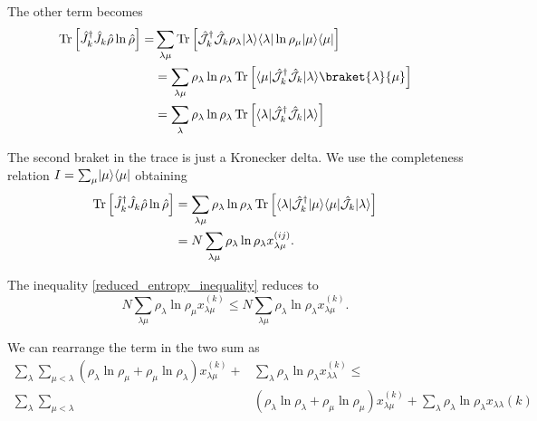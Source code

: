 The other term becomes
\begin{equation}
    \begin{split}
        \Tr\left[\hat J_{k}^\dagger \hat J_{k}\hat\rho\ln\hat\rho\right]=& \sum_{\lambda\mu}\Tr\left[\hat{\mathcal{J}}_{k}^\dagger \hat{\mathcal{J}}_{k}\rho_\lambda\ket{\lambda}\bra{\lambda}\ln\rho_\mu\ket{\mu}\bra{\mu}\right]\\
        & = \sum_{\lambda\mu}\rho_\lambda\ln\rho_\lambda\Tr\left[\bra{\mu}\hat{\mathcal{J}}_{k}^\dagger\hat{\mathcal{J}}_{k}\ket{\lambda}\braket{\lambda}{\mu}\right]\\
        &= \sum_{\lambda}\rho_\lambda\ln\rho_\lambda\Tr\left[\bra{\lambda}\hat{\mathcal{J}}_{k}^\dagger\hat{\mathcal{J}}_{k}\ket{\lambda}\right]\\
    \end{split}
\end{equation}

The second braket in the trace is just a Kronecker delta. We use the completeness relation $I = \sum_\mu\lvert\mu\rangle\langle\mu\rvert$ obtaining
\begin{equation}
    \begin{split}
        \operatorname{Tr}\left[\hat J_{k}^\dagger \hat J_{k}\hat\rho\ln\hat\rho\right]&= \sum_{\lambda\mu}\rho_\lambda\ln\rho_\lambda\operatorname{Tr}\left[\langle\lambda\rvert\hat{\mathcal{J}}_{k}^\dagger\lvert\mu\rangle\langle\mu\rvert\hat{\mathcal{J}}_{k}\lvert\lambda\rangle\right]\\
        &= N\sum_{\lambda\mu}\rho_\lambda\ln\rho_\lambda x^{(ij)}_{\lambda\mu}.\\
    \end{split}
\end{equation}


The inequality \eqref{reduced_entropy_inequality} reduces to 
\begin{equation}
    N \sum_{\lambda\mu}\rho_\lambda\ln\rho_\mu x^{(k)}_{\lambda\mu} \leq N\sum_{\lambda\mu}\rho_\lambda\ln\rho_\lambda x^{(k)}_{\lambda\mu}.
\end{equation}

We can rearrange the term in the two sum as
\begin{equation}
    \begin{split}
        \sum_{\lambda}\sum_{\mu<\lambda}\left(\rho_\lambda\ln\rho_\mu + \rho_\mu\ln\rho_\lambda \right) x^{(k)}_{\lambda\mu} +&\sum_\lambda \rho_\lambda\ln\rho_\lambda x^{(k)}_{\lambda\lambda} \leq\\ 
        \sum_{\lambda}\sum_{\mu<\lambda}&\left(\rho_\lambda\ln\rho_\lambda+ \rho_\mu\ln\rho_\mu\right)x^{(k)}_{\lambda\mu} + \sum_{\lambda}\rho_\lambda\ln\rho_\lambda x_{\lambda\lambda}{(k)} 
    \end{split}
\end{equation}

